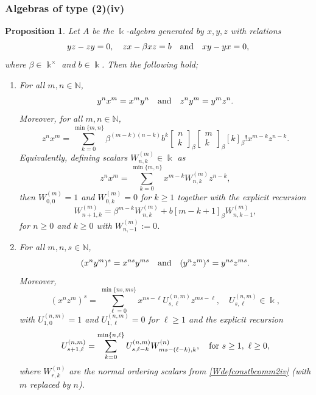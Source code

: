 \documentclass{amsart}
\newtheorem{proposition}[theorem]{Proposition}
\theoremstyle{definition}
\theoremstyle{remark}
\numberwithin{equation}{section}
\begin{document}
\subsubsection{Algebras of type (2)(iv)}

\begin{proposition}\label{case(2)(iv)}
Let $A$ be the $\Bbbk$-algebra generated by $x, y, z$ with relations
\[
yz - zy = 0, \quad zx - \beta xz = b \quad {\rm and} \quad xy - yx = 0,
\]
where $\beta\in\Bbbk^{\times}$ and $b\in\Bbbk$. Then the following hold;
\begin{enumerate}
\item[\rm (1)] For all $m,n\in \mathbb{N}$,
\[
y^n x^m = x^m y^n \quad {\rm and} \quad z^n y^m = y^m z^n.
\]
Moreover, for all $m, n\in \mathbb{N}$, 
\begin{equation}\label{znxmclosedconstbcomm2iv}
z^n x^m =\sum_{k=0}^{\min\{m,n\}}\beta^{(m-k)(n-k)}b^k\begin{bmatrix} n\\ k\end{bmatrix}_{\beta}\begin{bmatrix} m\\ k\end{bmatrix}_{\beta}
[k]_{\beta}!x^{m-k}z^{n-k}.
\end{equation}
Equivalently, defining scalars $W^{(m)}_{n,k}\in\Bbbk$ as 
\begin{equation}\label{Wdefconstbcomm2iv}
z^n x^m=\sum_{k=0}^{\min\{m,n\}} x^{m-k}W^{(m)}_{n,k}z^{n-k},
\end{equation}
then $W^{(m)}_{0,0} = 1$ and $W^{(m)}_{0,k} = 0$ for $k\ge 1$ together with the explicit recursion
\begin{equation}\label{Wrecconstbcomm2iv}
W^{(m)}_{n+1,k} = \beta^{m-k}W^{(m)}_{n,k}+b[m-k+1]_{\beta} W^{(m)}_{n,k-1},
\end{equation}
for $n\ge 0$ and $k\ge 0$ with $W^{(m)}_{n,-1}:=0$.

\item[\rm (2)] For all $m,n,s\in \mathbb{N}$,
\[
(x^n y^m)^s=x^{ns}y^{ms} \quad{\rm and} \quad (y^n z^m)^s=y^{ns}z^{ms}.
\]
Moreover,
\begin{equation}\label{xnzmUconstbcomm2iv}
(x^n z^m)^s = \sum_{\ell=0}^{\min\{ns,ms\}} x^{ns-\ell}U^{(n,m)}_{s,\ell}z^{ms-\ell},\quad U^{(n,m)}_{s,\ell}\in\Bbbk,
\end{equation}
with $U^{(n,m)}_{1,0} = 1$ and  $U^{(n,m)}_{1,\ell}=0$ for $\ell\ge 1$ and the explicit recursion
\begin{equation}\label{Urecconstbcomm2iv}
U^{(n,m)}_{s+1,\ell}=\sum_{k=0}^{\min\{n,\ell\}}U^{(n,m)}_{s,\ell-k}W^{(n)}_{ms-(\ell-k),k}, \quad {\rm for}\, \, s\ge 1,\ \ell\ge 0,
\end{equation}
where $W^{(n)}_{r,k}$ are the normal ordering scalars from \eqref{Wdefconstbcomm2iv} {\rm (}with $m$ replaced by $n${\rm )}.


\end{enumerate}
\end{proposition}
\end{document}
